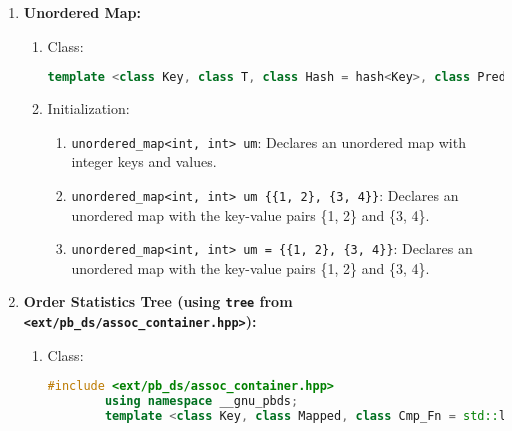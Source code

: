 \begin{enumerate}
\begin{enumerate}
\begin{enumerate}
\begin{lstlisting}[language=C++]
	    \end{lstlisting}
	  \item Initialization:
	    \begin{enumerate}
	      \item \texttt{unordered\_set<int> us}: Declares an unordered set of integers.
	      \item \texttt{unordered\_set<int> us \{1, 2, 3, 4\}}: Declares an unordered set of integers with the elements 1, 2, 3, and 4.
	      \item \texttt{unordered\_set<int> us = \{1, 2, 3, 4\}}: Declares an unordered set of integers with the elements 1, 2, 3, and 4.
	    \end{enumerate}
	\end{enumerate}
      \item \textbf{Unordered Map:}
	\begin{enumerate}
	  \item Class:
	    \begin{lstlisting}[language=C++]
	    template <class Key, class T, class Hash = hash<Key>, class Pred = equal_to<Key>, class Alloc = allocator<pair<const Key, T>>> class unordered_map;
	    \end{lstlisting}
	  \item Initialization:
	    \begin{enumerate}
	      \item \texttt{unordered\_map<int, int> um}: Declares an unordered map with integer keys and values.
	      \item \texttt{unordered\_map<int, int> um \{\{1, 2\}, \{3, 4\}\}}: Declares an unordered map with the key-value pairs \{1, 2\} and \{3, 4\}.
	      \item \texttt{unordered\_map<int, int> um = \{\{1, 2\}, \{3, 4\}\}}: Declares an unordered map with the key-value pairs \{1, 2\} and \{3, 4\}.
	    \end{enumerate}
	\end{enumerate}
      \item \textbf{Order Statistics Tree (using \texttt{tree} from \texttt{<ext/pb\_ds/assoc\_container.hpp>}):}
	\begin{enumerate}
	  \item Class:
	    \begin{lstlisting}[language=C++]
	    #include <ext/pb_ds/assoc_container.hpp>
	    using namespace __gnu_pbds;
	    template <class Key, class Mapped, class Cmp_Fn = std::less<Key>, class Tag = rb_tree_tag, class Node_Update = null_node_update, class Alloc = std::allocator<char>> class tree;

\end{lstlisting}
\end{enumerate}
\end{enumerate}
\end{enumerate}

